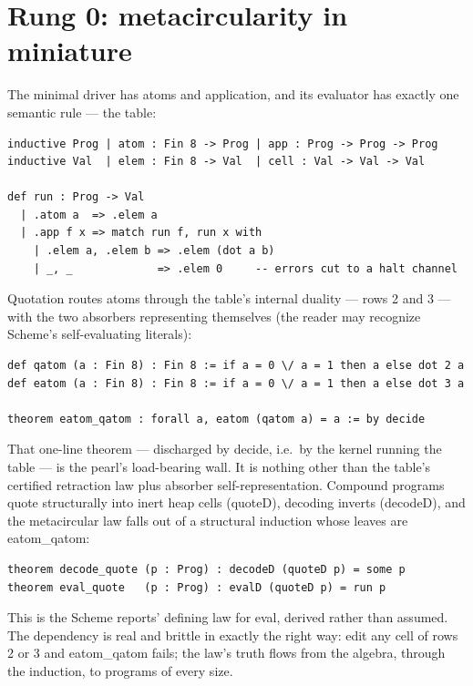 \documentclass[acmsmall,screen,review]{acmart}
\begin{document}
\section{Rung 0: metacircularity in miniature}
\label{sec:rung0}

The minimal driver has atoms and application, and its evaluator has
exactly one semantic rule --- the table:

\begin{lstlisting}
inductive Prog | atom : Fin 8 -> Prog | app : Prog -> Prog -> Prog
inductive Val  | elem : Fin 8 -> Val  | cell : Val -> Val -> Val

def run : Prog -> Val
  | .atom a  => .elem a
  | .app f x => match run f, run x with
    | .elem a, .elem b => .elem (dot a b)
    | _, _             => .elem 0     -- errors cut to a halt channel
\end{lstlisting}

Quotation routes atoms through the table's internal duality --- rows
2 and 3 --- with the two absorbers representing themselves (the
reader may recognize Scheme's self-evaluating literals):

\begin{lstlisting}
def qatom (a : Fin 8) : Fin 8 := if a = 0 \/ a = 1 then a else dot 2 a
def eatom (a : Fin 8) : Fin 8 := if a = 0 \/ a = 1 then a else dot 3 a

theorem eatom_qatom : forall a, eatom (qatom a) = a := by decide
\end{lstlisting}

That one-line theorem --- discharged by \textsf{decide}, i.e.\ by the
kernel running the table --- is the pearl's load-bearing wall. It is
nothing other than the table's certified retraction law plus absorber
self-representation. Compound programs quote structurally into inert
heap cells (\textsf{quoteD}), decoding inverts
(\textsf{decodeD}), and the metacircular law falls out of a
structural induction whose leaves are \textsf{eatom\_qatom}:

\begin{lstlisting}
theorem decode_quote (p : Prog) : decodeD (quoteD p) = some p
theorem eval_quote   (p : Prog) : evalD (quoteD p) = run p
\end{lstlisting}

This is the Scheme reports' defining law for \textsf{eval},
derived rather than assumed. The dependency is real and brittle in
exactly the right way: edit any cell of rows 2 or 3 and
\textsf{eatom\_qatom} fails; the law's truth flows from the algebra,
through the induction, to programs of every size.
\end{document}
